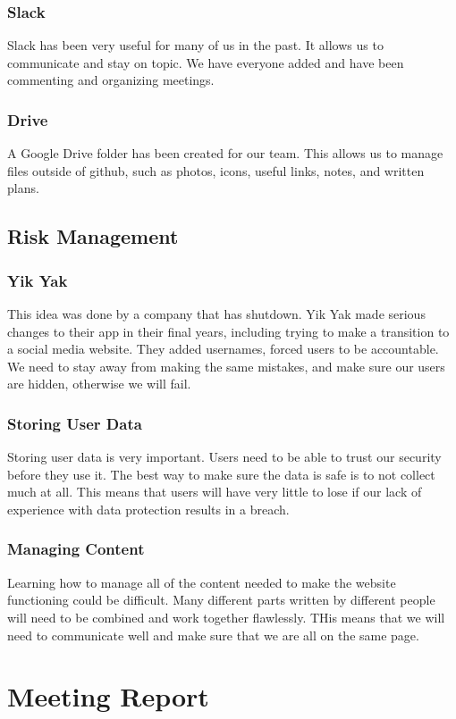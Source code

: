 \documentclass[12pt]{article}
\begin{document}
\subsubsection{Slack}
	Slack has been very useful for many of us in the past. It allows us to communicate and stay on topic. We have everyone added and have been commenting and organizing meetings.
\subsubsection{Drive}
	A Google Drive folder has been created for our team. This allows us to manage files outside of github, such as photos, icons, useful links, notes, and written plans.

\subsection{Risk Management}
\subsubsection{Yik Yak}
	This idea was done by a company that has shutdown. Yik Yak made serious changes to their app in their final years, including trying to make a transition to a social media website. They added usernames, forced users to be accountable. We need to stay away from making the same mistakes, and make sure our users are hidden, otherwise we will fail.
\subsubsection{Storing User Data}
	Storing user data is very important. Users need to be able to trust our security before they use it. The best way to make sure the data is safe is to not collect much at all. This means that users will have very little to lose if our lack of experience with data protection results in a breach.
\subsubsection{Managing Content}
	Learning how to manage all of the content needed to make the website functioning could be difficult. Many different parts written by different people will need to be combined and work together flawlessly. THis means that we will need to communicate well and make sure that we are all on the same page.


\section{Meeting Report}
\end{document}
